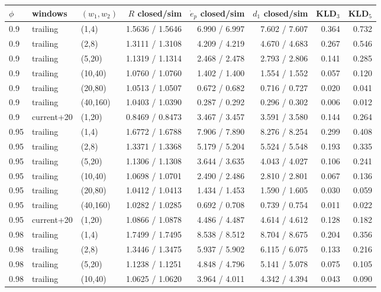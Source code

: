 \begin{tabular}{lllrrrrr}
\toprule
$\phi$ & windows & $(w_1,w_2)$ & $R$ closed/sim & $\dot e_p$ closed/sim & $d_1$ closed/sim & KLD$_3$ & KLD$_5$\\
\midrule
0.9 & trailing & (1,4) & 1.5636 / 1.5646 & 6.990 / 6.997 & 7.602 / 7.607 & 0.364 & 0.732\\
0.9 & trailing & (2,8) & 1.3111 / 1.3108 & 4.209 / 4.219 & 4.670 / 4.683 & 0.267 & 0.546\\
0.9 & trailing & (5,20) & 1.1319 / 1.1314 & 2.468 / 2.478 & 2.793 / 2.806 & 0.141 & 0.285\\
0.9 & trailing & (10,40) & 1.0760 / 1.0760 & 1.402 / 1.400 & 1.554 / 1.552 & 0.057 & 0.120\\
0.9 & trailing & (20,80) & 1.0513 / 1.0507 & 0.672 / 0.682 & 0.716 / 0.727 & 0.020 & 0.041\\
0.9 & trailing & (40,160) & 1.0403 / 1.0390 & 0.287 / 0.292 & 0.296 / 0.302 & 0.006 & 0.012\\
0.9 & current+20 & (1,20) & 0.8469 / 0.8473 & 3.467 / 3.457 & 3.591 / 3.580 & 0.144 & 0.264\\
0.95 & trailing & (1,4) & 1.6772 / 1.6788 & 7.906 / 7.890 & 8.276 / 8.254 & 0.299 & 0.408\\
0.95 & trailing & (2,8) & 1.3371 / 1.3368 & 5.179 / 5.204 & 5.524 / 5.548 & 0.193 & 0.335\\
0.95 & trailing & (5,20) & 1.1306 / 1.1308 & 3.644 / 3.635 & 4.043 / 4.027 & 0.106 & 0.241\\
0.95 & trailing & (10,40) & 1.0698 / 1.0701 & 2.490 / 2.486 & 2.810 / 2.801 & 0.067 & 0.136\\
0.95 & trailing & (20,80) & 1.0412 / 1.0413 & 1.434 / 1.453 & 1.590 / 1.605 & 0.030 & 0.059\\
0.95 & trailing & (40,160) & 1.0282 / 1.0285 & 0.692 / 0.708 & 0.739 / 0.754 & 0.011 & 0.022\\
0.95 & current+20 & (1,20) & 1.0866 / 1.0878 & 4.486 / 4.487 & 4.614 / 4.612 & 0.128 & 0.182\\
0.98 & trailing & (1,4) & 1.7499 / 1.7495 & 8.538 / 8.512 & 8.704 / 8.675 & 0.204 & 0.356\\
0.98 & trailing & (2,8) & 1.3446 / 1.3475 & 5.937 / 5.902 & 6.115 / 6.075 & 0.133 & 0.216\\
0.98 & trailing & (5,20) & 1.1238 / 1.1251 & 4.848 / 4.796 & 5.141 / 5.078 & 0.075 & 0.105\\
0.98 & trailing & (10,40) & 1.0625 / 1.0620 & 3.964 / 4.011 & 4.342 / 4.394 & 0.043 & 0.090\\

\end{tabular}
